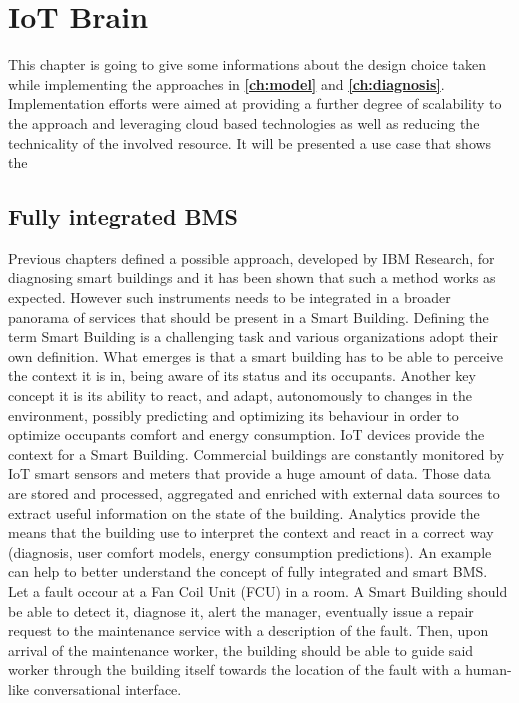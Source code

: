\chapter{IoT Brain} \label{ch:framework}

This chapter is going to give some informations about the design choice taken while implementing the approaches in \textbf{\autoref{ch:model}} and \textbf{\autoref{ch:diagnosis}}.
Implementation efforts were aimed at providing a further degree of scalability to the approach and leveraging cloud based technologies as well as reducing the technicality of the involved resource.
It will be presented a use case that shows the %
\section{Fully integrated BMS}
Previous chapters defined a possible approach, developed by IBM Research, for diagnosing smart buildings and it has been shown that such a method works as expected.
However such instruments needs to be integrated in a broader panorama of services that should be present in a Smart Building. Defining the term Smart Building is a challenging task and various organizations adopt their own definition. %
What emerges is that a smart building has to be able to perceive the context it is in, being aware of its status and its occupants. Another key concept it is its ability to react, and adapt, autonomously to changes in the environment, possibly predicting and optimizing its behaviour in order to optimize occupants comfort and energy consumption.
IoT devices provide the context for a Smart Building. Commercial buildings are constantly monitored by IoT smart sensors and meters that provide a huge amount of data. Those data are stored and processed, aggregated and enriched with external data sources to extract useful information on the state of the building. %
Analytics provide the means that the building use to interpret the context and react in a correct way (diagnosis, user comfort models, energy consumption predictions). An example can help to better understand the concept of fully integrated and smart BMS. Let a fault occour at a Fan Coil Unit (FCU) in a room. A Smart Building should be able to detect it, diagnose it, alert the manager, eventually issue a repair request to the maintenance service with a description of the fault. Then, upon arrival of the maintenance worker, the building should be able to guide said worker through the building itself towards the location of the fault with a human-like conversational interface.

